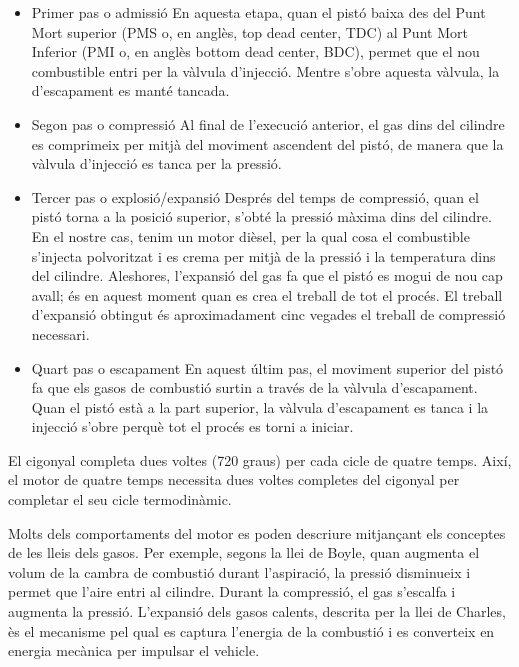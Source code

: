 \begin{itemize}

\item{Primer pas o admissió}
En aquesta etapa, quan el pistó baixa des del Punt Mort superior (PMS o, en anglès, top dead center, TDC) al Punt Mort Inferior (PMI o, en anglès bottom dead center, BDC), permet que el nou combustible entri per la vàlvula d'injecció. Mentre s'obre aquesta vàlvula, la d'escapament es manté tancada.

\item{Segon pas o compressió}
Al final de l'execució anterior, el gas dins del cilindre es comprimeix per mitjà del moviment ascendent del pistó, de manera que la vàlvula d'injecció es tanca per la pressió.

\item{Tercer pas o explosió/expansió}
Després del temps de compressió, quan el pistó torna a la posició superior, s'obté la pressió màxima dins del cilindre. En el nostre cas, tenim un motor dièsel, per la qual cosa el combustible s'injecta polvoritzat i es crema per mitjà de la pressió i la temperatura dins del cilindre. Aleshores, l'expansió del gas fa que el pistó es mogui de nou cap avall; és en aquest moment quan es crea el treball de tot el procés. El treball d'expansió obtingut és aproximadament cinc vegades el treball de compressió necessari.

\item Quart pas o escapament
En aquest últim pas, el moviment superior del pistó fa que els gasos de combustió surtin a través de la vàlvula d'escapament. Quan el pistó està a la part superior, la vàlvula d'escapament es tanca i la injecció s'obre perquè tot el procés es torni a iniciar.
\end{itemize}

El cigonyal completa dues voltes (720 graus) per cada cicle de quatre temps. Així, el motor de quatre temps necessita dues voltes completes del cigonyal per completar el seu cicle termodinàmic.

Molts dels comportaments del motor es poden descriure mitjan\c{c}ant els conceptes de les lleis dels gasos. Per exemple, segons la llei de Boyle, quan augmenta el volum de la cambra de combusti\'o durant l'aspiraci\'o, la pressi\'o disminueix i permet que l'aire entri al cilindre. Durant la compressi\'o, el gas s'escalfa i augmenta la pressi\'o. L'expansi\'o dels gasos calents, descrita per la llei de Charles, \`es el mecanisme pel qual es captura l'energia de la combusti\'o i es converteix en energia mec\`anica per impulsar el vehicle\cite{bowers_understanding_2014}.

